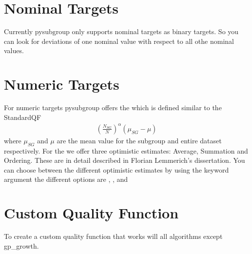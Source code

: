 \documentclass[letterpaper,10pt,english]{sphinxmanual}
\begin{document}
\section{Nominal Targets}
\label{\detokenize{targets:nominal-targets}}
Currently pysubgroup only supports nominal targets as binary targets.
So you can look for deviations of one nominal value with respect to all othe nominal values.


\section{Numeric Targets}
\label{\detokenize{targets:numeric-targets}}
For numeric targets pysubgroup offers the  which is defined similar to the StandardQF
\begin{equation*}
\begin{split}\left ( \frac{N_{SG}}{N}  \right ) ^\alpha \left (\mu_{SG} - \mu \right )\end{split}
\end{equation*}
where \(\mu_{SG}\) and \(\mu\) are the mean value for the subgroup and entire dataset respectively.
For the  we offer three optimistic estimates:  Average, Summation and Ordering. These are in detail described in Florian Lemmerich’s dissertation.
You can choose between the different optimistic estimates by using the keyword argument  the different options are , , and 


\section{Custom Quality Function}
\label{\detokenize{targets:custom-quality-function}}\label{\detokenize{targets:customtarget}}
To create a custom quality function that works will all algorithms except gp\_growth.
\end{document}
